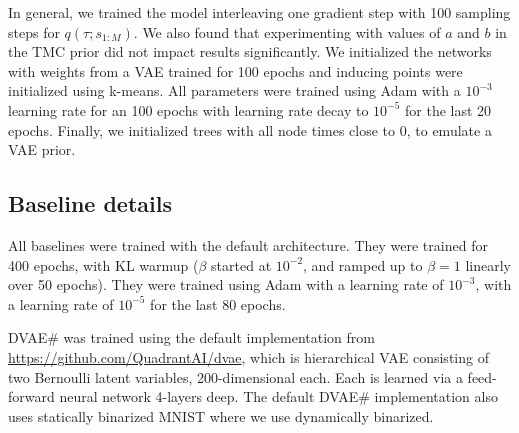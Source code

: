 In general, we trained the model interleaving
one gradient step with 100 sampling steps for $q(\tau; s_{1:M})$.
We also found that experimenting with values of $a$ and $b$
in the TMC prior did not impact results significantly.
We initialized the networks with weights
from a VAE trained for 100 epochs and inducing points
were initialized using k-means. All parameters
were trained using Adam \citep{kingma2015adam} with a $10^{-3}$ learning rate
for an 100 epochs with learning rate decay to $10^{-5}$ for the last 20 epochs. 
Finally, we initialized trees with all node times close to 0,
to emulate a VAE prior.

\subsection{Baseline details}
All baselines were trained with the default architecture.
They were trained for 400 epochs,
with KL warmup ($\beta$ started at $10^{-2}$, and ramped up to $\beta = 1$
linearly over 50 epochs). They were trained using Adam with a
learning rate of $10^{-3}$, with a learning rate of $10^{-5}$ for
the last 80 epochs.

DVAE\# was trained using the default implementation from
\url{https://github.com/QuadrantAI/dvae}, which is hierarchical
VAE consisting of two Bernoulli latent variables, 200-dimensional each.
Each is learned via a feed-forward neural network 4-layers deep.
The default DVAE\# implementation also uses statically binarized MNIST
where we use dynamically binarized.
